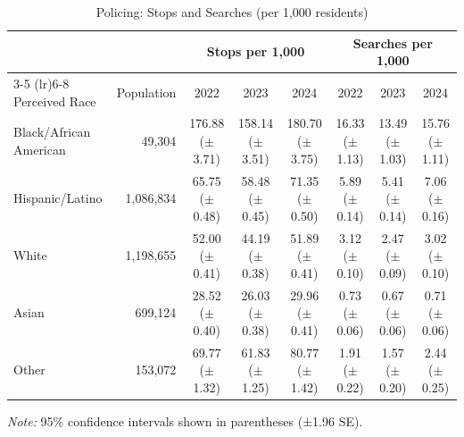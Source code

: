 \begin{table}[H]
\centering
\caption{Policing: Stops and Searches (per 1,000 residents)}
\label{tab:stops_searches}
\begin{tabular}{l r ccc ccc}
\toprule
 & & \multicolumn{3}{c}{Stops per 1,000} & \multicolumn{3}{c}{Searches per 1,000} \\
\cmidrule(lr){3-5} \cmidrule(lr){6-8}
Perceived Race & Population & 2022 & 2023 & 2024 & 2022 & 2023 & 2024 \\
\midrule
Black/African American & 49,304 & 176.88 ({\scriptsize $\pm$3.71}) & 158.14 ({\scriptsize $\pm$3.51}) & 180.70 ({\scriptsize $\pm$3.75}) & 16.33 ({\scriptsize $\pm$1.13}) & 13.49 ({\scriptsize $\pm$1.03}) & 15.76 ({\scriptsize $\pm$1.11}) \\
Hispanic/Latino & 1,086,834 & 65.75 ({\scriptsize $\pm$0.48}) & 58.48 ({\scriptsize $\pm$0.45}) & 71.35 ({\scriptsize $\pm$0.50}) & 5.89 ({\scriptsize $\pm$0.14}) & 5.41 ({\scriptsize $\pm$0.14}) & 7.06 ({\scriptsize $\pm$0.16}) \\
White & 1,198,655 & 52.00 ({\scriptsize $\pm$0.41}) & 44.19 ({\scriptsize $\pm$0.38}) & 51.89 ({\scriptsize $\pm$0.41}) & 3.12 ({\scriptsize $\pm$0.10}) & 2.47 ({\scriptsize $\pm$0.09}) & 3.02 ({\scriptsize $\pm$0.10}) \\
Asian & 699,124 & 28.52 ({\scriptsize $\pm$0.40}) & 26.03 ({\scriptsize $\pm$0.38}) & 29.96 ({\scriptsize $\pm$0.41}) & 0.73 ({\scriptsize $\pm$0.06}) & 0.67 ({\scriptsize $\pm$0.06}) & 0.71 ({\scriptsize $\pm$0.06}) \\
Other & 153,072 & 69.77 ({\scriptsize $\pm$1.32}) & 61.83 ({\scriptsize $\pm$1.25}) & 80.77 ({\scriptsize $\pm$1.42}) & 1.91 ({\scriptsize $\pm$0.22}) & 1.57 ({\scriptsize $\pm$0.20}) & 2.44 ({\scriptsize $\pm$0.25}) \\
\bottomrule
\end{tabular}
\smallskip
\parbox{\textwidth}{\footnotesize \textit{Note:} 95\% confidence intervals shown in parentheses (±1.96 SE).}
\end{table}